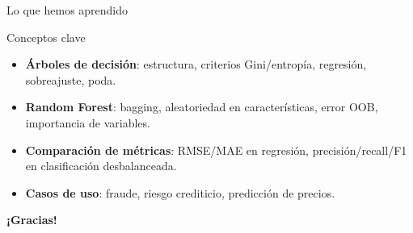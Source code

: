 \documentclass[aspectratio=169, 10pt, xcolor=table]{beamer}
\begin{document}
\begin{frame}{Lo que hemos aprendido}
    \begin{exampleblock}{Conceptos clave}
        \begin{itemize}
            \item \textbf{Árboles de decisión}: estructura, criterios Gini/entropía, regresión, sobreajuste, poda.
            \item \textbf{Random Forest}: bagging, aleatoriedad en características, error OOB, importancia de variables.
            \item \textbf{Comparación de métricas}: RMSE/MAE en regresión, precisión/recall/F1 en clasificación desbalanceada.
            \item \textbf{Casos de uso}: fraude, riesgo crediticio, predicción de precios.
        \end{itemize}
    \end{exampleblock}

\end{frame}

\begin{frame}
    \centering
    \Huge \textbf{¡Gracias!}

\end{frame}
\end{document}
